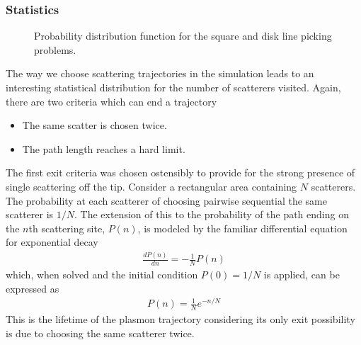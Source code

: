 \subsubsection{Statistics}
\begin{figure}
\centering
\caption{Probability distribution function for the square and disk line
picking problems.}
\label{fig:linepickingpdf}
\end{figure}
The way we choose scattering trajectories in the simulation leads to an
interesting statistical distribution for the number of scatterers visited.
Again, there are two criteria which can end a trajectory
\begin{itemize}
\item The same scatter is chosen twice.
\item The path length reaches a hard limit.
\end{itemize}
The first exit criteria was chosen ostensibly to provide for the strong
presence of single scattering off the tip.  Consider a rectangular area
containing $N$ scatterers.  The probability at each scatterer of choosing
pairwise sequential the same scatterer is $1/N$.  The extension of this to
the probability of the path ending on the $n$th scattering site, $P(n)$, is
modeled by the familiar differential equation for exponential decay
\begin{align}
\frac{d P(n)}{dn} = -\frac{1}{N}P(n)
\end{align}
which, when solved and the initial condition $P(0)=1/N$ is applied, can be
expressed as
\begin{align}
P(n)=\frac{1}{N}e^{-n/N}
\end{align}
This is the lifetime of the plasmon trajectory considering its only exit
possibility is due to choosing the same scatterer twice.

